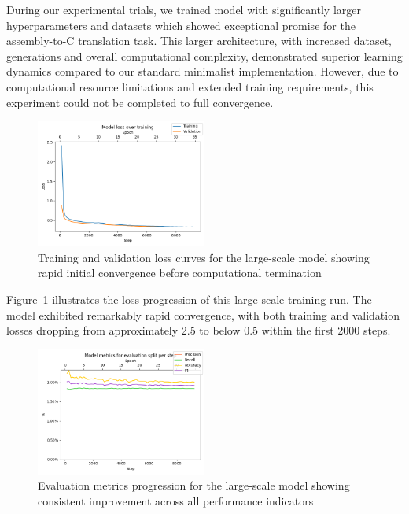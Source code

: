 \documentclass[../main.tex]{subfiles}
\begin{document}
During our experimental trials, we trained model with significantly larger hyperparameters and datasets which showed exceptional promise for the assembly-to-C translation task. This larger architecture, with increased dataset, generations and overall computational complexity, demonstrated superior learning dynamics compared to our standard minimalist implementation. However, due to computational resource limitations and extended training requirements, this experiment could not be completed to full convergence.

\begin{figure}[htbp]
\centering
\includegraphics[width=0.5\textwidth]{images/loss_per_step.png}
\caption{Training and validation loss curves for the large-scale model showing rapid initial convergence before computational termination}
\label{fig:large_model_loss}
\end{figure}

Figure~\ref{fig:large_model_loss} illustrates the loss progression of this large-scale training run. The model exhibited remarkably rapid convergence, with both training and validation losses dropping from approximately 2.5 to below 0.5 within the first 2000 steps.

\begin{figure}[htbp]
\centering
\includegraphics[width=0.5\textwidth]{images/metrics_per_step.png}
\caption{Evaluation metrics progression for the large-scale model showing consistent improvement across all performance indicators}
\label{fig:large_model_metrics}
\end{figure}
\end{document}
